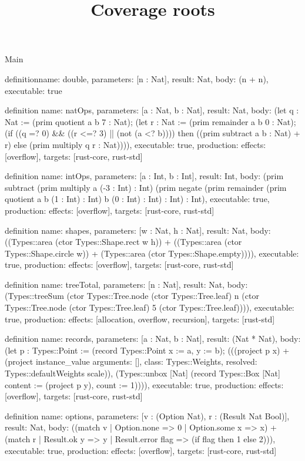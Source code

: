 \begin{lexlean}{Main}
\title{Coverage roots}
\begin{semanticmodule}
definition{name: double, parameters: [n : Nat], result: Nat, body: (n + n), executable: true}

definition{
  name: natOps,
  parameters: [a : Nat, b : Nat],
  result: Nat,
  body: (let q : Nat := (prim quotient a b 7 : Nat); (let r : Nat := (prim remainder a b 0 : Nat); (if ((q =? 0) && ((r <=? 3) || (not (a <? b)))) then ((prim subtract a b : Nat) + r) else (prim multiply q r : Nat)))),
  executable: true,
  production: {effects: [overflow], targets: [rust-core, rust-std]}
}

definition{
  name: intOps,
  parameters: [a : Int, b : Int],
  result: Int,
  body: (prim subtract (prim multiply a (-3 : Int) : Int) (prim negate (prim remainder (prim quotient a b (1 : Int) : Int) b (0 : Int) : Int) : Int) : Int),
  executable: true,
  production: {effects: [overflow], targets: [rust-core, rust-std]}
}

definition{
  name: shapes,
  parameters: [w : Nat, h : Nat],
  result: Nat,
  body: ((Types::area (ctor Types::Shape.rect w h)) + ((Types::area (ctor Types::Shape.circle w)) + (Types::area (ctor Types::Shape.empty)))),
  executable: true,
  production: {effects: [overflow], targets: [rust-core, rust-std]}
}

definition{
  name: treeTotal,
  parameters: [n : Nat],
  result: Nat,
  body: (Types::treeSum (ctor Types::Tree.node (ctor Types::Tree.leaf) n (ctor Types::Tree.node (ctor Types::Tree.leaf) 5 (ctor Types::Tree.leaf)))),
  executable: true,
  production: {effects: [allocation, overflow, recursion], targets: [rust-std]}
}

definition{
  name: records,
  parameters: [a : Nat, b : Nat],
  result: (Nat * Nat),
  body: (let p : Types::Point := (record Types::Point {x := a, y := b}); (((project p x) + (project instance_value{
    arguments: [],
    class: Types::Weights,
    resolved: Types::defaultWeights
  } scale)), (Types::unbox [Nat] (record Types::Box [Nat] {content := (project p y), count := 1})))),
  executable: true,
  production: {effects: [overflow], targets: [rust-core, rust-std]}
}

definition{
  name: options,
  parameters: [v : (Option Nat), r : (Result Nat Bool)],
  result: Nat,
  body: ((match v
    | Option.none => 0
    | Option.some x => x) + (match r
    | Result.ok y => y
    | Result.error flag => (if flag then 1 else 2))),
  executable: true,
  production: {effects: [overflow], targets: [rust-core, rust-std]}
}


\end{semanticmodule}
\end{lexlean}
